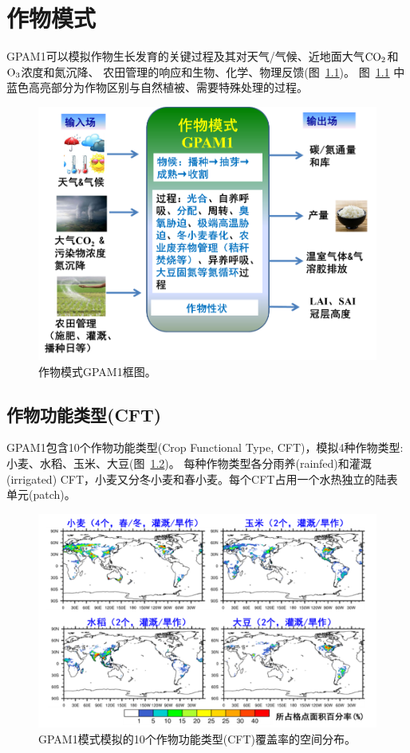\chapter{作物模式}

GPAM1可以模拟作物生长发育的关键过程及其对天气/气候、近地面大气$\rm CO_2$和$\rm O_3$浓度和氮沉降、
农田管理的响应和生物、化学、物理反馈(图~\ref{fig:作物模式GPAM1框图})。
图~\ref{fig:作物模式GPAM1框图} 中蓝色高亮部分为作物区别与自然植被、需要特殊处理的过程。
{
\begin{figure}[htbp]
\centering
\includegraphics{Figures/作物模式/作物模式GPAM1框图.png}
\caption{作物模式GPAM1框图。  }
\label{fig:作物模式GPAM1框图}
\end{figure}
}


\section{作物功能类型(CFT)}
GPAM1包含10个作物功能类型(Crop Functional Type, CFT)，模拟4种作物类型: 小麦、水稻、玉米、大豆(图~\ref{fig:作物功能类型覆盖率的空间分布})。
每种作物类型各分雨养(rainfed)和灌溉(irrigated) CFT，小麦又分冬小麦和春小麦。每个CFT占用一个水热独立的陆表单元(patch)。
{
\begin{figure}[htbp]
\centering
\includegraphics{Figures/作物模式/作物功能类型覆盖率的空间分布.png}
\caption{GPAM1模式模拟的10个作物功能类型(CFT)覆盖率的空间分布。}
\label{fig:作物功能类型覆盖率的空间分布}
\end{figure}
}



